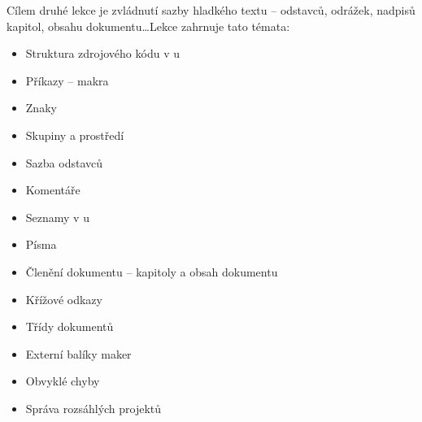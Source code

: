 {
	Cílem druhé lekce je zvládnutí sazby hladkého textu -- odstavců, odrážek, nadpisů kapitol, obsahu dokumentu\ldots Lekce zahrnuje tato témata:
	\begin{itemize}
		\item Struktura zdrojového kódu v u
		\item Příkazy -- makra
		\item Znaky
		\item Skupiny a prostředí
		\item Sazba odstavců
		\item Komentáře
		\item Seznamy v u
		\item Písma
		\item Členění dokumentu -- kapitoly a obsah dokumentu
		\item Křížové odkazy
		\item Třídy dokumentů
		\item Externí balíky maker
		\item Obvyklé chyby
		\item Správa rozsáhlých projektů
	\end{itemize}
}
\endinput
